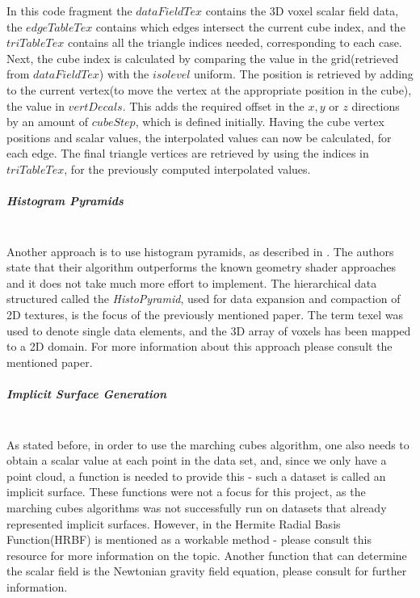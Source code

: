\documentclass[]{article}
\begin{document}
\begin{appendices}
In this code fragment  the $dataFieldTex$ contains the 3D voxel scalar field data, the $edgeTableTex$ contains which edges intersect the current cube index, and the $triTableTex$ contains all the triangle indices needed, corresponding to each case. Next, the cube index is calculated by comparing the value in the grid(retrieved from $dataFieldTex$) with the $isolevel$ uniform. The position is retrieved by adding to the current vertex(to move the vertex at the appropriate position in the cube), the value in $vertDecals$. This adds the required offset in the $x,y$ or $z$ directions by an amount of $cubeStep$, which is defined initially. Having the cube vertex positions and scalar values, the interpolated values can now be calculated, for each edge. The final triangle vertices are retrieved by using the indices in $triTableTex$, for the previously computed interpolated values.

\subparagraph{Histogram Pyramids}\mbox{}\\

Another approach is to use histogram pyramids, as described in \cite{dyken2007}. The authors state that their algorithm outperforms the known geometry shader approaches and it does not take much more effort to implement. The hierarchical data structured called the \textit{HistoPyramid}, used for data expansion and compaction of 2D textures, is the focus of the previously mentioned paper. The term texel was used to denote single data elements, and the 3D array of voxels has been mapped to a 2D domain. For more information about this approach please consult the mentioned paper.


\subparagraph{Implicit Surface Generation}\mbox{}\\

As stated before, in order to use the marching cubes algorithm, one also needs to obtain a scalar value at each point in the data set, and, since we only have a point cloud, a function is needed to provide this - such a dataset is called an implicit surface. These functions were not a focus for this project, as the marching cubes algorithms was not successfully run on datasets that already represented implicit surfaces. However, in \cite{navpreet2013} the Hermite Radial Basis Function(HRBF) is mentioned as a workable method - please consult this resource for more information on the topic. Another function that can determine the scalar field is the Newtonian gravity field equation, please consult \cite{max2013} for further information.

\end{appendices}
\end{document}
